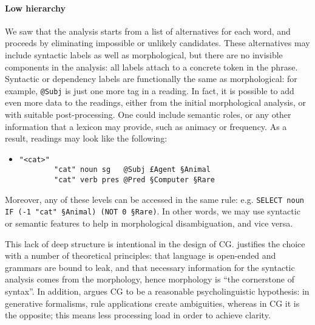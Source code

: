 \paragraph{Low hierarchy}


We saw that the analysis starts from a list of alternatives for each word, and proceeds by eliminating impossible or unlikely candidates.
These alternatives may include syntactic labels as well as morphological, but there are no invisible components in the analysis: all labels attach to a concrete token in the phrase.
Syntactic or dependency labels are functionally the same as morphological: for example, \texttt{@Subj} is just one more tag in a reading.
In fact, it is possible to add even more data to the readings, either from the initial morphological analysis, or with suitable post-processing. One could include semantic roles, or any other information that a lexicon may provide, such as animacy or frequency.
As a result, readings may look like the following:

\begin{itemize}
\item[] 
\begin{verbatim}
"<cat>"
        "cat" noun sg   @Subj £Agent §Animal
        "cat" verb pres @Pred §Computer §Rare
\end{verbatim}
\end{itemize}

\noindent Moreover, any of these levels can be accessed in the same rule: e.g. \texttt{SELECT noun IF (-1 "cat" §Animal) (NOT 0 §Rare)}. 
In other words, we may use syntactic or semantic features to help in morphological disambiguation, and vice versa.

This lack of deep structure is intentional in the design of CG.
\cite{karlsson1995constraint} justifies the choice with a number of
theoretical principles: that language is open-ended and grammars are
bound to leak, and that necessary information for the syntactic analysis
comes from the morphology, hence morphology is ``the cornerstone of
syntax''. 
In addition, \cite{karlsson1995constraint} argues CG to be a reasonable 
psycholinguistic hypothesis: in generative formalisms, rule applications create 
ambiguities, whereas in CG it is the opposite; this means less processing load 
in order to achieve clarity. 


